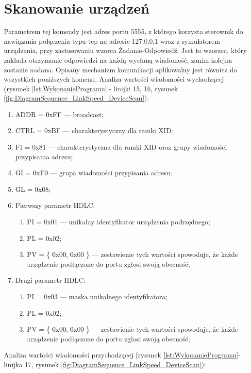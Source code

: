 \section{Skanowanie urządzeń}
Parametrem tej komendy jest adres portu 5555, z którego korzysta sterownik
do nawiązania połączenia typu tcp na adresie 127.0.0.1 wraz z symulatorem urządzenia,
przy zastosowaniu wzorca Żadanie-Odpowiedź. Jest to wzorzec, który zakłada otrzymanie odpowiedzi na każdą wysłaną wiadomość, zanim kolejna zostanie nadana. 
Opisany mechanizm komunikacji aplikowalny jest również do wszystkich poniższych komend.
\newline\newline
Analiza wartości wiadomości wychodzącej 
(rysunek \ref{lst:WykonanieProgramu} - linijki {15, 16}, rysunek \ref{fig:DiagramSequence_LinkSpeed_DeviceScan}):
\begin{enumerate}
    \item ADDR = 0xFF --- broadcast;
    \item CTRL = 0xBF --- charakterystyczny dla ramki XID;
    \item FI = 0x81 --- charakterystyczna dla ramki XID oraz grupy wiadomości przypisania adresu;
    \item GI = 0xF0 --- grupa wiadomości przypisania adresu;
    \item GL = 0x08;
    \item Pierwszy parametr HDLC:
    \begin{enumerate}
        \item PI = 0x01 --- unikalny identyfikator urządzenia podrzędnego;
        \item PL = 0x02;
        \item PV = \{ 0x00, 0x00 \} --- zestawienie tych wartości spowoduje, że każde urządzenie podłączone do portu zgłosi swoją obecność;
    \end{enumerate}
    \item Drugi parametr HDLC:
    \begin{enumerate}
        \item PI = 0x03 --- maska unikalnego identyfikatora;
        \item PL = 0x02;
        \item PV = \{ 0x00, 0x00 \}  --- zestawienie tych wartości spowoduje, że każde urządzenie podłączone do portu zgłosi swoją obecność;
    \end{enumerate}
\end{enumerate}
\bigskip
Analiza wartości wiadomości przychodzącej 
(rysunek \ref{lst:WykonanieProgramu}- linijka 17, rysunek \ref{fig:DiagramSequence_LinkSpeed_DeviceScan}):
